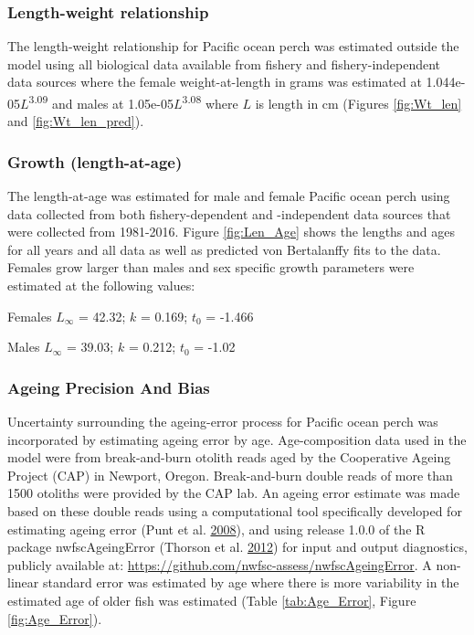 \documentclass[12pt,]{article}
\begin{document}
\subsubsection{Length-weight
relationship}\label{length-weight-relationship}

The length-weight relationship for Pacific ocean perch was estimated
outside the model using all biological data available from fishery and
fishery-independent data sources where the female weight-at-length in
grams was estimated at 1.044e-05\(L\)\textsuperscript{3.09} and males at
1.05e-05\(L\)\textsuperscript{3.08} where \(L\) is length in cm (Figures
\ref{fig:Wt_len} and \ref{fig:Wt_len_pred}).

\subsubsection{Growth (length-at-age)}\label{growth-length-at-age}

The length-at-age was estimated for male and female Pacific ocean perch
using data collected from both fishery-dependent and -independent data
sources that were collected from 1981-2016. Figure \ref{fig:Len_Age}
shows the lengths and ages for all years and all data as well as
predicted von Bertalanffy fits to the data. Females grow larger than
males and sex specific growth parameters were estimated at the following
values:

\begin{centering}

Females $L_{\infty}$ = 42.32; $k$ = 0.169; $t_0$ = -1.466

Males $L_{\infty}$ = 39.03; $k$ = 0.212; $t_0$ = -1.02

\end{centering}

\subsubsection{Ageing Precision And
Bias}\label{ageing-precision-and-bias}

Uncertainty surrounding the ageing-error process for Pacific ocean perch
was incorporated by estimating ageing error by age. Age-composition data
used in the model were from break-and-burn otolith reads aged by the
Cooperative Ageing Project (CAP) in Newport, Oregon. Break-and-burn
double reads of more than 1500 otoliths were provided by the CAP lab. An
ageing error estimate was made based on these double reads using a
computational tool specifically developed for estimating ageing error
(Punt et al. \protect\hyperlink{ref-punt_quantifying_2008}{2008}), and
using release 1.0.0 of the R package nwfscAgeingError (Thorson et al.
\protect\hyperlink{ref-thorson_nwfscageingerror:_2012}{2012}) for input
and output diagnostics, publicly available at:
\url{https://github.com/nwfsc-assess/nwfscAgeingError}. A non-linear
standard error was estimated by age where there is more variability in
the estimated age of older fish was estimated (Table
\ref{tab:Age_Error}, Figure \ref{fig:Age_Error}).
\end{document}
